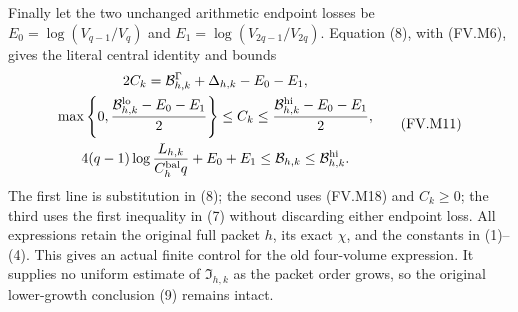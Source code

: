 Finally let the two unchanged arithmetic endpoint losses be
$E_0=\log(V_{q-1}/V_q)$ and $E_1=\log(V_{2q-1}/V_{2q})$.
Equation (8), with (FV.M6), gives the literal central identity and bounds
\[
 \begin{gathered}
 2C_k=\mathcal B^\Gamma_{h,k}+\Delta_{h,k}-E_0-E_1,\\
 \max\left\{0,\frac{\mathcal B_{h,k}^{\rm lo}-E_0-E_1}{2}\right\}
 \le C_k\le
 \frac{\mathcal B_{h,k}^{\rm hi}-E_0-E_1}{2},\\
 4(q-1)\log\frac{L_{h,k}}{C_h^{\rm bal}q}+E_0+E_1
 \le\mathcal B_{h,k}\le\mathcal B_{h,k}^{\rm hi}.
 \end{gathered}\tag{FV.M11}\label{fvmetric:central}
\]
The first line is substitution in (8); the second uses (FV.M18) and
$C_k\ge0$; the third uses the first inequality in (7) without
discarding either endpoint loss. All expressions retain the original
full packet $h$, its exact $\chi$, and the constants in (1)--(4).
This gives an actual finite control for the old four-volume expression.
It supplies no uniform estimate of $\mathfrak I_{h,k}$ as the packet
order grows, so the original lower-growth conclusion (9) remains intact.

